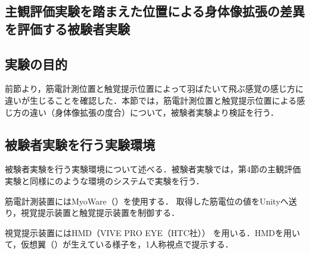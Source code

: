 \begin{small}
\section{主観評価実験を踏まえた位置による身体像拡張の差異を評価する被験者実験}
        
  \subsection{実験の目的}
    前節より，筋電計測位置と触覚提示位置によって羽ばたいて飛ぶ感覚の感じ方に違いが生じることを確認した．本節では，筋電計測位置と触覚提示位置による感じ方の違い（身体像拡張の度合）について，被験者実験より検証を行う．

  \subsection{被験者実験を行う実験環境}





        被験者実験を行う実験環境について述べる．被験者実験では，第4節の主観評価実験と同様にのような環境のシステムで実験を行う．

        筋電計測装置にはMyoWare（）を使用する．
        取得した筋電位の値をUnityへ送り，視覚提示装置と触覚提示装置を制御する．

        視覚提示装置にはHMD（VIVE PRO EYE（HTC社））
        を用いる．HMDを用いて，仮想翼（）が生えている様子を，1人称視点で提示する．




\end{small}
